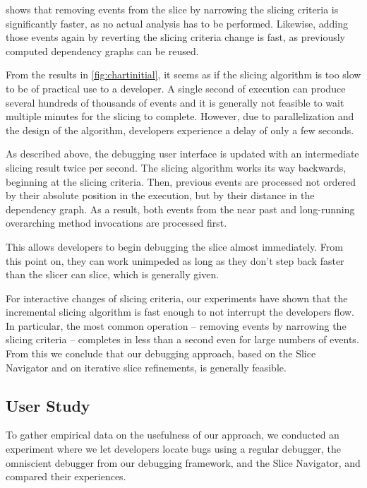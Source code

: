  shows that removing events from the slice by narrowing the slicing criteria is significantly faster, as no actual analysis has to be performed.
Likewise, adding those events again by reverting the slicing criteria change is fast, as previously computed dependency graphs can be reused.

\medskip

From the results in \cref{fig:chartinitial}, it seems as if the slicing algorithm is too slow to be of practical use to a developer.
A single second of execution can produce several hundreds of thousands of events and it is generally not feasible to wait multiple minutes for the slicing to complete.
However, due to parallelization and the design of the algorithm, developers experience a delay of only a few seconds.

As described above, the debugging user interface is updated with an intermediate slicing result twice per second.
The slicing algorithm works its way backwards, beginning at the slicing criteria.
Then, previous events are processed not ordered by their absolute position in the execution, but by their distance in the dependency graph.
As a result, both events from the near past and long-running overarching method invocations are processed first.

This allows developers to begin debugging the slice almost immediately. 
From this point on, they can work unimpeded as long as they don't step back faster than the slicer can slice, which is generally given.

For interactive changes of slicing criteria, our experiments have shown that the incremental slicing algorithm is fast enough to not interrupt the developers flow.
In particular, the most common operation -- removing events by narrowing the slicing criteria -- completes in less than a second even for large numbers of events.
From this we conclude that our debugging approach, based on the Slice Navigator and on iterative slice refinements, is generally feasible.

\subsection{User Study}

To gather empirical data on the usefulness of our approach, we conducted an experiment where we let developers locate bugs using a regular debugger, the omniscient debugger from our debugging framework, and the Slice Navigator, and compared their experiences.

